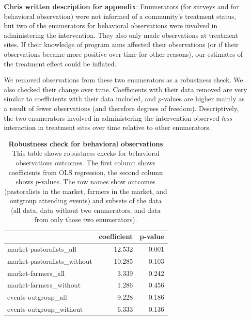 \documentclass[
]{article}
\begin{document}
\textbf{Chris written description for appendix}: Enumerators (for
surveys and for behavioral observation) were not informed of a
community's treatment status, but two of the enumerators for behavioral
observations were involved in administering the intervention. They also
only made observations at treatment sites. If their knowledge of program
aims affected their observations (or if their observations became more
positive over time for other reasons), our estimates of the treatment
effect could be inflated.

We removed observations from these two enumerators as a robustness
check. We also checked their change over time. Coefficients with their
data removed are very similar to coefficients with their data included,
and \(p\)-values are higher mainly as a result of fewer observations
(and therefore degrees of freedom). Descriptively, the two enumerators
involved in administering the intervention observed \emph{less}
interaction in treatment sites over time relative to other enumerators.

\begin{table}[H]
\begin{center}
\label{tab:behObs_enumsCheck_tab}
\caption{\textbf{Robustness check for behavioral observations} This table shows robustness checks for behavioral observations outcomes. The first column shows coefficients from OLS regression, the second column shows $p$-values. The row names show  outcomes (pastoralists in the market, farmers in the market, and outgroup attending events) and subsets of the data (all data, data without two enumerators, and data from only those two enumerators).}
\smallskip

\begin{tabular}{l|r|r}
\hline
  & coefficient & p-value\\
\hline
market-pastoralists\_all & 12.532 & 0.001\\
\hline
market-pastoralists\_without & 10.285 & 0.103\\
\hline
market-farmers\_all & 3.339 & 0.242\\
\hline
market-farmers\_without & 1.286 & 0.456\\
\hline
events-outgroup\_all & 9.228 & 0.186\\
\hline
events-outgroup\_without & 6.333 & 0.136\\
\hline
\end{tabular}


\end{center}
\end{table}
\end{document}
